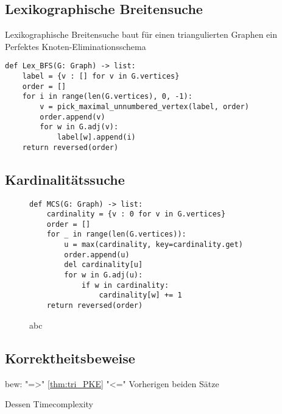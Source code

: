 \documentclass[../main.tex]{subfiles}
\begin{document}
\subsection{Lexikographische Breitensuche}



\begin{listing}[ht]
\label{algo:LexBFS}
\caption{Lexikographische Breitensuche baut für einen triangulierten Graphen ein Perfektes Knoten-Eliminationsschema}
\begin{verbatim}
def Lex_BFS(G: Graph) -> list:
    label = {v : [] for v in G.vertices}
    order = []
    for i in range(len(G.vertices), 0, -1):
        v = pick_maximal_unnumbered_vertex(label, order)
        order.append(v)
        for w in G.adj(v):
            label[w].append(i)
    return reversed(order)
\end{verbatim}
\end{listing}


\subsection{Kardinalitätssuche}

\begin{figure}[ht]
\label{algo:MCS}
\centering
\begin{verbatim}
def MCS(G: Graph) -> list:
    cardinality = {v : 0 for v in G.vertices}
    order = []
    for _ in range(len(G.vertices)):
        u = max(cardinality, key=cardinality.get)
        order.append(u)
        del cardinality[u]
        for w in G.adj(u):
            if w in cardinality:
                cardinality[w] += 1
    return reversed(order)
\end{verbatim}
\caption{abc}
\end{figure}


\subsection{Korrektheitsbeweise}



bew: "=>" \ref{thm:tri_PKE}
"<=" Vorherigen beiden Sätze

Dessen Timecomplexity


\end{document}
